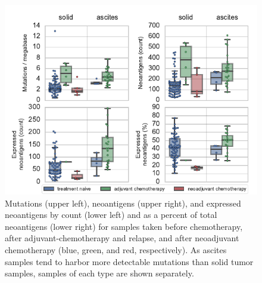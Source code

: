 \begin{figure}
\centering
\includegraphics[scale=1.0]{figures/counts.pdf}
\caption{Mutations (upper left), neoantigens (upper right), and expressed neoantigens by count (lower left) and as a percent of total neoantigens (lower right) for samples taken before chemotherapy, after adjuvant-chemotherapy and relapse, and after neoadjuvant chemotherapy (blue, green, and red, respectively). As ascites samples tend to harbor more detectable mutations than solid tumor samples, samples of each type are shown separately. }
\label{fig:counts}
\end{figure}


